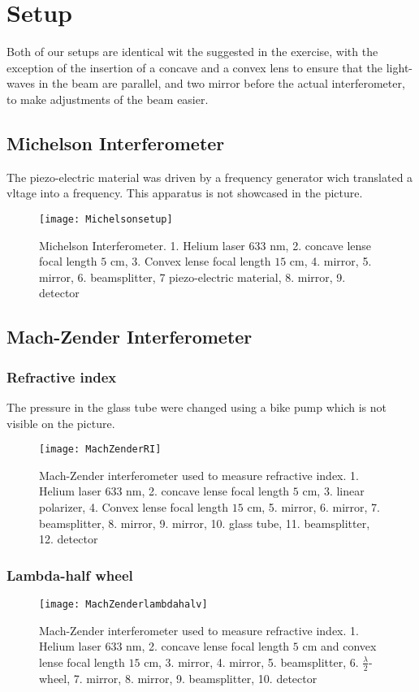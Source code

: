 \section{Setup}

Both of our setups are identical wit the suggested in the exercise, with the exception of the insertion of a concave and a convex lens to ensure that the light-waves in the beam are parallel, and two mirror before the actual interferometer, to make adjustments of the beam easier. 

\subsection{Michelson Interferometer}

The piezo-electric material was driven by a frequency generator wich translated a vltage into a frequency. This apparatus is not showcased in the picture. 

\begin{figure}[H]
	\caption{Michelson Interferometer. 1. Helium laser 633 nm, 2. concave lense focal length $5$ cm, 3. Convex lense focal length $15$ cm, 4. mirror, 5. mirror, 6. beamsplitter, 7 piezo-electric material, 8. mirror, 9. detector}
	\centering
	\texttt{[image: Michelsonsetup]}
\end{figure}

\subsection{Mach-Zender Interferometer}

\subsubsection{Refractive index}

The pressure in the glass tube were changed using a bike pump which is not visible on the picture. 


\begin{figure}[H]
	\caption{Mach-Zender interferometer used to measure refractive index. 1. Helium laser 633 nm, 2. concave lense focal length $5$ cm, 3. linear polarizer, 4. Convex lense focal length $15$ cm, 5. mirror, 6. mirror, 7. beamsplitter, 8. mirror, 9. mirror, 10. glass tube, 11. beamsplitter, 12. detector}
	\centering
	\texttt{[image: MachZenderRI]}
\end{figure}

\subsubsection{Lambda-half wheel}

\begin{figure}[H]
	\caption{Mach-Zender interferometer used to measure refractive index. 1. Helium laser 633 nm, 2. concave lense focal length $5$ cm and convex lense focal length $15$ cm, 3. mirror, 4. mirror, 5. beamsplitter, 6. $\frac{\lambda}{2}$-wheel,  7. mirror, 8. mirror, 9. beamsplitter, 10. detector}
	\centering
	\texttt{[image: MachZenderlambdahalv]}
\end{figure}
